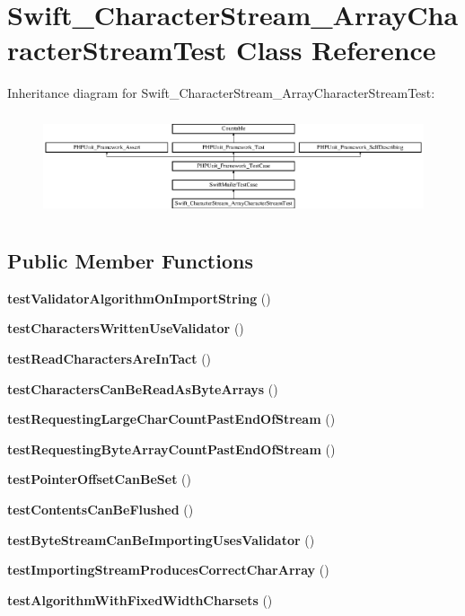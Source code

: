 \section{Swift\+\_\+\+Character\+Stream\+\_\+\+Array\+Character\+Stream\+Test Class Reference}
\label{class_swift___character_stream___array_character_stream_test}
Inheritance diagram for Swift\+\_\+\+Character\+Stream\+\_\+\+Array\+Character\+Stream\+Test\+:\begin{figure}[H]
\begin{center}
\leavevmode
\includegraphics[height=3.020496cm]{class_swift___character_stream___array_character_stream_test}
\end{center}
\end{figure}
\subsection*{Public Member Functions}
\begin{DoxyCompactItemize}
\item 
{\bf test\+Validator\+Algorithm\+On\+Import\+String} ()
\item 
{\bf test\+Characters\+Written\+Use\+Validator} ()
\item 
{\bf test\+Read\+Characters\+Are\+In\+Tact} ()
\item 
{\bf test\+Characters\+Can\+Be\+Read\+As\+Byte\+Arrays} ()
\item 
{\bf test\+Requesting\+Large\+Char\+Count\+Past\+End\+Of\+Stream} ()
\item 
{\bf test\+Requesting\+Byte\+Array\+Count\+Past\+End\+Of\+Stream} ()
\item 
{\bf test\+Pointer\+Offset\+Can\+Be\+Set} ()
\item 
{\bf test\+Contents\+Can\+Be\+Flushed} ()
\item 
{\bf test\+Byte\+Stream\+Can\+Be\+Importing\+Uses\+Validator} ()
\item 
{\bf test\+Importing\+Stream\+Produces\+Correct\+Char\+Array} ()
\item 
{\bf test\+Algorithm\+With\+Fixed\+Width\+Charsets} ()
\end{DoxyCompactItemize}
